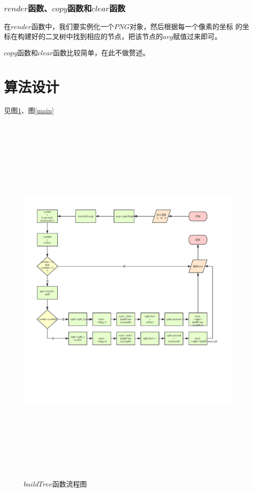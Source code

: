 \documentclass[UTF8]{ctexart}
\begin{document}
		\subsubsection{$render$函数、$copy$函数和$clear$函数}
		\indent 在$render$函数中，我们要实例化一个$PNG$对象，然后根据每一个像素的坐标	的坐标在构建好的二叉树中找到相应的节点，把该节点的$avg$赋值过来即可。
		
		\indent $copy$函数和$clear$函数比较简单，在此不做赘述。	
	
	\section{算法设计}
	见图\ref{buildTree}、图\ref{main}


\begin{figure}[H]
	\centering 
	\includegraphics[width=20cm, height=19cm]{buildTree.pdf} 
	\caption{$buildTree$函数流程图} 
	\label{buildTree}
\end{figure}
\end{document}
